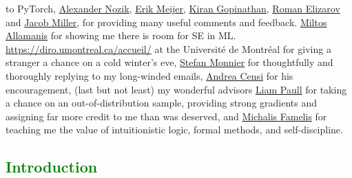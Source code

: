 \documentclass[12pt,initial,twoside,maitrise]{dms}
\newcommand{\welldone}[1]{\textcolor{green}{#1}}
\numberwithin{equation}{section}
\numberwithin{table}{chapter}
\numberwithin{figure}{chapter}
\begin{document}
to PyTorch, \href{https://research.jetbrains.org/researchers/altavir}{Alexander Nozik}, \href{https://twitter.com/headinthebox}{Erik Meijer}, \href{https://scholar.google.com/citations?user=IcuGXgcAAAAJ}{Kiran Gopinathan}, \href{https://medium.com/@elizarov}{Roman Elizarov} and \href{https://cquic.unm.edu/member/jacob.miller/}{Jacob Miller}, for providing many useful comments and feedback. \href{https://miltos.allamanis.com/}{Miltos Allamanis} for showing me there is room for SE in ML. \href{Celine Begin}{https://diro.umontreal.ca/accueil/} at the Universit\'e de Montr\'eal for giving a stranger a chance on a cold winter's eve, \href{https://www.iro.umontreal.ca/~monnier/}{Stefan Monnier} for thoughtfully and thoroughly replying to my long-winded emails, \href{https://censi.science/}{Andrea Censi} for his encouragement, (last but not least) my wonderful advisors \href{http://liampaull.ca/}{Liam Paull} for taking a chance on an out-of-distribution sample, providing strong gradients and assigning far more credit to me than was deserved, and \href{https://michalis.famelis.info/}{Michalis Famelis} for teaching me the value of intuitionistic logic, formal methods, and self-discipline.


\anglais
\cleardoublepage
{}  %
\tableofcontents
\cleardoublepage
{}  %
\listoftables
\cleardoublepage
{}
\listoffigures

\NoChapterPageNumber
\cleardoublepage
{}

\welldone{\chapter{Introduction}\label{ch:introduction}}
\end{document}
